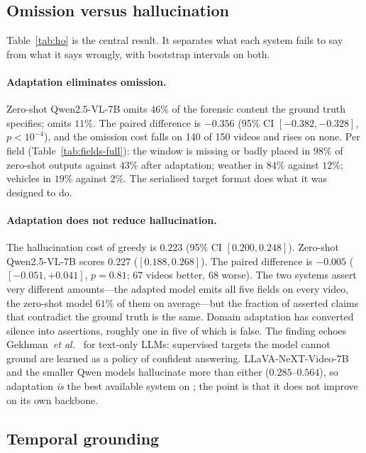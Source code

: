 \subsection{Omission versus hallucination}
\label{sec:ho}

Table~\ref{tab:ho} is the central result.
It separates what each system fails to say from what it says wrongly, with bootstrap intervals on both.



\paragraph{Adaptation eliminates omission.}
Zero-shot Qwen2.5-VL-7B omits $46\%$ of the forensic content the ground truth specifies; \crashlogic{} omits $11\%$.
The paired difference is $-0.356$ (95\% CI $[-0.382,-0.328]$, $p<10^{-4}$), and the omission cost falls on 140 of 150 videos and rises on none.
Per field (Table~\ref{tab:fields-full}): the window is missing or badly placed in $98\%$ of zero-shot outputs against $43\%$ after adaptation; weather in $84\%$ against $12\%$; vehicles in $19\%$ against $2\%$.
The serialised target format does what it was designed to do.

\paragraph{Adaptation does not reduce hallucination.}
The hallucination cost of \crashlogic{} greedy is $0.223$ (95\% CI $[0.200,0.248]$).
Zero-shot Qwen2.5-VL-7B scores $0.227$ ($[0.188,0.268]$).
The paired difference is $-0.005$ ($[-0.051,+0.041]$, $p{=}0.81$; 67 videos better, 68 worse).
The two systems assert very different amounts---the adapted model emits all five fields on every video, the zero-shot model $61\%$ of them on average---but the fraction of asserted claims that contradict the ground truth is the same.
Domain adaptation has converted silence into assertions, roughly one in five of which is false.
The finding echoes Gekhman~\emph{et al.}~\cite{gekhman2024finetuning} for text-only LLMs: supervised targets the model cannot ground are learned as a policy of confident answering.
LLaVA-NeXT-Video-7B and the smaller Qwen models hallucinate more than either ($0.285$--$0.564$), so adaptation \emph{is} the best available system on \Hcost{}; the point is that it does not improve on its own backbone.

\subsection{Temporal grounding}
\label{sec:temporal}

